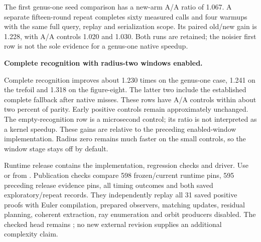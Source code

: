 The first genus-one seed comparison has a new-arm A/A ratio of 1.067.
A separate fifteen-round repeat completes sixty measured calls and four
warmups with the same full query, replay and serialization scope. Its
paired old/new gain is 1.228, with A/A controls 1.020 and 1.030.
Both runs are retained; the noisier first row is not the sole evidence
for a genus-one native speedup.

\begin{samepage}
\noindent\textbf{Complete recognition with radius-two windows enabled.}

\end{samepage}

Complete recognition improves about 1.230 times on the genus-one case,
1.241 on the trefoil and 1.318 on the figure-eight. The latter two include
the established complete fallback after native misses. These rows have
A/A controls within about two percent of parity. Early positive controls
remain approximately unchanged. The empty-recognition row is a microsecond
control; its ratio is not interpreted as a kernel speedup. These gains are
relative to the preceding enabled-window implementation. Radius zero remains
much faster on the small controls, so the window stage stays off by default.

\begin{sloppypar}
Runtime release  contains the implementation, regression
checks and  driver. Use
 or  from .
Publication checks compare 598 frozen/current runtime pins, 595 preceding
release evidence pins, all timing outcomes and both saved exploratory/repeat
records. They independently replay all 31 saved positive proofs with Euler
compilation, prepared observers, matching updates, residual planning,
coherent extraction, ray enumeration and orbit producers disabled.
The checked  head remains ; no new
external revision supplies an additional complexity claim.
\end{sloppypar}
